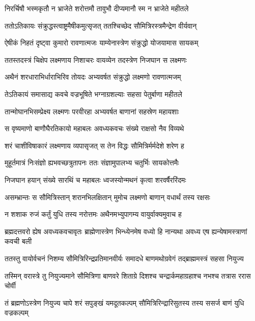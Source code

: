 \twolineshloka
{निरर्चिषौ भस्मकृतौ न भ्राजेते शरोत्तमौ}
{तावुभौ दीप्यमानौ स्म न भ्राजेते महीतले} %

\twolineshloka
{ततोऽतिकायः संक्रुद्धस्त्वाष्ट्रमैषीकमुत्सृजत्}
{ततश्चिच्छेद सौमित्रिरस्त्रमैन्द्रेण वीर्यवान्} %

\twolineshloka
{ऐषीकं निहतं दृष्ट्वा कुमारो रावणात्मजः}
{याम्येनास्त्रेण संक्रुद्धो योजयामास सायकम्} %

\twolineshloka
{ततस्तदस्त्रं चिक्षेप लक्ष्मणाय निशाचरः}
{वायव्येन तदस्त्रेण निजघान स लक्ष्मणः} %

\twolineshloka
{अथैनं शरधाराभिर्धाराभिरिव तोयदः}
{अभ्यवर्षत संक्रुद्धो लक्ष्मणो रावणात्मजम्} %

\twolineshloka
{तेऽतिकायं समासाद्य कवचे वज्रभूषिते}
{भग्नाग्रशल्याः सहसा पेतुर्बाणा महीतले} %

\twolineshloka
{तान्मोघानभिसम्प्रेक्ष्य लक्ष्मणः परवीरहा}
{अभ्यवर्षत बाणानां सहस्रेण महायशाः} %

\twolineshloka
{स वृष्यमाणो बाणौघैरतिकायो महाबलः}
{अवध्यकवचः संख्ये राक्षसो नैव विव्यथे} %

\twolineshloka
{शरं चाशीविषाकारं लक्ष्मणाय व्यपासृजत्}
{स तेन विद्धः सौमित्रिर्मर्मदेशे शरेण ह} %

\twolineshloka
{मुहूर्तमात्रं निःसंज्ञो ह्यभवच्छत्रुतापनः}
{ततः संज्ञामुपालभ्य चतुर्भिः सायकोत्तमैः} %

\twolineshloka
{निजघान हयान् संख्ये सारथिं च महाबलः}
{ध्वजस्योन्मथनं कृत्वा शरवर्षैररिंदमः} %

\twolineshloka
{असम्भ्रान्तः स सौमित्रिस्तान् शरानभिलक्षितान्}
{मुमोच लक्ष्मणो बाणान् वधार्थं तस्य रक्षसः} %

\twolineshloka
{न शशाक रुजं कर्तुं युधि तस्य नरोत्तमः}
{अथैनमभ्युपागम्य वायुर्वाक्यमुवाच ह} %

\threelineshloka
{ब्रह्मदत्तवरो ह्येष अवध्यकवचावृतः}
{ब्राह्मेणास्त्रेण भिन्ध्येनमेष वध्यो हि नान्यथा}
{अवध्य एष ह्यन्येषामस्त्राणां कवची बली} %

\twolineshloka
{ततस्तु वायोर्वचनं निशम्य सौमित्रिरिन्द्रप्रतिमानवीर्यः}
{समादधे बाणमथोग्रवेगं तद्ब्राह्ममस्त्रं सहसा नियुज्य} %

\twolineshloka
{तस्मिन् वरास्त्रे तु नियुज्यमाने सौमित्रिणा बाणवरे शिताग्रे}
{दिशश्च चन्द्रार्कमहाग्रहाश्च नभश्च तत्रास ररास चोर्वी} %

\twolineshloka
{तं ब्रह्मणोऽस्त्रेण नियुज्य चापे शरं सपुङ्खं यमदूतकल्पम्}
{सौमित्रिरिन्द्रारिसुतस्य तस्य ससर्ज बाणं युधि वज्रकल्पम्} %

